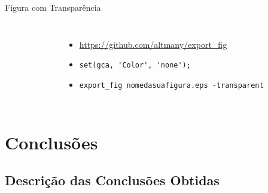 \documentclass[%
  10pt,%
  aspectratio = 43,%
  compress,%
  t,%
  english,%
  brazilian,%
]{beamer}
\begin{document}
\begin{frame} {Figura com Transparência}

\begin{columns}
\column{8cm}
\begin{figure}[!htb]
\centering%
\label{fig:cdf}
\end{figure}
\column{4cm}
\begin{itemize}
\vfill
\item \url{https://github.com/altmany/export_fig}
\vfill
\item \lstinline{set(gca, 'Color', 'none');}
\vfill
\item \lstinline{export_fig nomedasuafigura.eps -transparent}
\vfill
\end{itemize}
\end{columns}

\end{frame}

\section{Conclusões}\label{sec:concl}

\subsection{Descrição das Conclusões Obtidas}\label{ssec:concl1}
\end{document}
